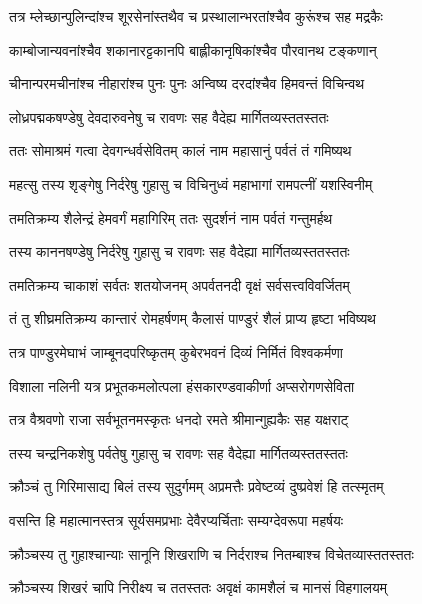 \twolineshloka
{तत्र म्लेच्छान्पुलिन्दांश्च शूरसेनांस्तथैव च}
{प्रस्थालान्भरतांश्चैव कुरूंश्च सह मद्रकैः} %

\twolineshloka
{काम्बोजान्यवनांश्चैव शकानारट्टकानपि}
{बाह्लीकानृषिकांश्चैव पौरवानथ टङ्कणान्} %

\twolineshloka
{चीनान्परमचीनांश्च नीहारांश्च पुनः पुनः}
{अन्विष्य दरदांश्चैव हिमवन्तं विचिन्वथ} %

\twolineshloka
{लोध्रपद्मकषण्डेषु देवदारुवनेषु च}
{रावणः सह वैदेह्य मार्गितव्यस्ततस्ततः} %

\twolineshloka
{ततः सोमाश्रमं गत्वा देवगन्धर्वसेवितम्}
{कालं नाम महासानुं पर्वतं तं गमिष्यथ} %

\twolineshloka
{महत्सु तस्य शृङ्गेषु निर्दरेषु गुहासु च}
{विचिनुध्वं महाभागां रामपत्नीं यशस्विनीम्} %

\twolineshloka
{तमतिक्रम्य शैलेन्द्रं हेमवर्गं महागिरिम्}
{ततः सुदर्शनं नाम पर्वतं गन्तुमर्हथ} %

\twolineshloka
{तस्य काननषण्डेषु निर्दरेषु गुहासु च}
{रावणः सह वैदेह्या मार्गितव्यस्ततस्ततः} %

\twolineshloka
{तमतिक्रम्य चाकाशं सर्वतः शतयोजनम्}
{अपर्वतनदी वृक्षं सर्वसत्त्वविवर्जितम्} %

\twolineshloka
{तं तु शीघ्रमतिक्रम्य कान्तारं रोमहर्षणम्}
{कैलासं पाण्डुरं शैलं प्राप्य हृष्टा भविष्यथ} %

\twolineshloka
{तत्र पाण्डुरमेघाभं जाम्बूनदपरिष्कृतम्}
{कुबेरभवनं दिव्यं निर्मितं विश्वकर्मणा} %

\twolineshloka
{विशाला नलिनी यत्र प्रभूतकमलोत्पला}
{हंसकारण्डवाकीर्णा अप्सरोगणसेविता} %

\twolineshloka
{तत्र वैश्रवणो राजा सर्वभूतनमस्कृतः}
{धनदो रमते श्रीमान्गुह्यकैः सह यक्षराट्} %

\twolineshloka
{तस्य चन्द्रनिकशेषु पर्वतेषु गुहासु च}
{रावणः सह वैदेह्या मार्गितव्यस्ततस्ततः} %

\twolineshloka
{क्रौञ्चं तु गिरिमासाद्य बिलं तस्य सुदुर्गमम्}
{अप्रमत्तैः प्रवेष्टव्यं दुष्प्रवेशं हि तत्स्मृतम्} %

\twolineshloka
{वसन्ति हि महात्मानस्तत्र सूर्यसमप्रभाः}
{देवैरप्यर्चिताः सम्यग्देवरूपा महर्षयः} %

\twolineshloka
{क्रौञ्चस्य तु गुहाश्चान्याः सानूनि शिखराणि च}
{निर्दराश्च नितम्बाश्च विचेतव्यास्ततस्ततः} %

\twolineshloka
{क्रौञ्चस्य शिखरं चापि निरीक्ष्य च ततस्ततः}
{अवृक्षं कामशैलं च मानसं विहगालयम्} %

